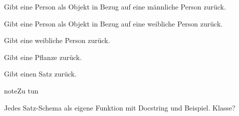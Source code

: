 \documentclass[a4paper,12pt,oneside]{sphinxmanual}
\begin{document}

\begin{fulllineitems}
\label{funktionen:pyzufall.person_objekt_m}
Gibt eine Person als Objekt in Bezug auf eine männliche Person zurück.

\end{fulllineitems}


\begin{fulllineitems}
\label{funktionen:pyzufall.person_objekt_w}
Gibt eine Person als Objekt in Bezug auf eine weibliche Person zurück.

\end{fulllineitems}


\begin{fulllineitems}
\label{funktionen:pyzufall.person_w}
Gibt eine weibliche Person zurück.

\end{fulllineitems}


\begin{fulllineitems}
\label{funktionen:pyzufall.pflanze}
Gibt eine Pflanze zurück.

\end{fulllineitems}


\begin{fulllineitems}
\label{funktionen:pyzufall.satz}
Gibt einen Satz zurück.

\begin{notice}{note}{Zu tun}

Jedes Satz-Schema als eigene Funktion mit Docstring und Beispiel. Klasse?
\end{notice}

\end{fulllineitems}

\end{document}
